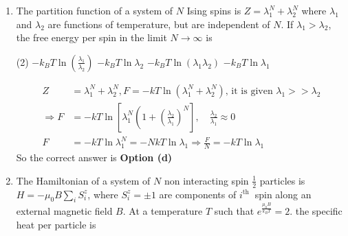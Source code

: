 \begin{enumerate}
\begin{answer}
\begin{align*}
\begin{array}{ccc}
	1 & 1 & -1 \\
	1 & -1 & 1 \\
	-1 & 1 & 1
	\end{array}\right\}-J\\
	&\begin{array}{lll}
	-1 & -1 & 1
	\end{array}\\
	&\left.\begin{array}{ccc}
	-1 & 1 & -1 \\
	1 & -1 & -1
	\end{array}\right\}-J\\
	&\left.\begin{array}{lll}
	-1 & -1 & -1
	\end{array}\right\} 3 J\\
	\Rightarrow&z=2 e^{-3 \beta J}+6 e^{\beta J}
	\end{align*}
	So the correct answer is \textbf{Option (b)}
\end{answer}
\item The partition function of a system of $N$ Ising spins is $Z=\lambda_{1}^{N}+\lambda_{2}^{N}$ where $\lambda_{1}$ and $\lambda_{2}$ are functions of temperature, but are independent of $N$. If $\lambda_{1}>\lambda_{2}$, the free energy per spin in the limit $N \rightarrow \infty$ is
{	}
 \begin{tasks}(2)
	\task[\textbf{a.}]$-k_{B} T \ln \left(\frac{\lambda_{1}}{\lambda_{2}}\right)$
	\task[\textbf{b.}] $-k_{B} T \ln \lambda_{2}$
	\task[\textbf{c.}]$-k_{B} T \ln \left(\lambda_{1} \lambda_{2}\right)$
	\task[\textbf{d.}] $-k_{B} T \ln \lambda_{1}$
\end{tasks}
\begin{answer}
	\begin{align*}
Z&=\lambda_{1}^{N}+\lambda_{2}^{N}, F=-k T \ln \left(\lambda_{1}^{N}+\lambda_{2}^{N}\right)\text{, it is given } \lambda_{1}>>\lambda_{2}\\
	\Rightarrow F&=-k T \ln \left[\lambda_{1}^{N}\left(1+\left(\frac{\lambda_{2}}{\lambda_{1}}\right)^{N}\right], \quad \frac{\lambda_{2}}{\lambda_{1}} \approx 0\right. \\
	F&=-k T \ln \lambda_{1}^{N}=-N k T \ln \lambda_{1} \Rightarrow \frac{F}{N}=-k T \ln \lambda_{1}
	\end{align*}
	So the correct answer is \textbf{Option (d)}
\end{answer}
\item The Hamiltonian of a system of $N$ non interacting spin $\frac{1}{2}$ particles is $H=-\mu_{0} B \sum_{i} S_{i}^{z}$, where $S_{i}^{z}=\pm 1$ are components of $i^{\text {th }}$ spin along an external magnetic field $B$. At a temperature $T$ such that $e^{\frac{\mu_{0} B}{k_{B} T}}=2$. the specific heat per particle is

\end{enumerate}
